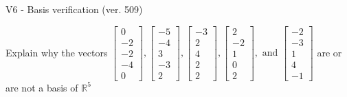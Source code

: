 \begin{exercise}
  \begin{exerciseTitle}V6 - Basis verification (ver. 509)\end{exerciseTitle}
  \begin{exerciseStatement}
    Explain why the vectors \(\left[\begin{array}{r}
0 \\
-2 \\
-2 \\
-4 \\
0
\end{array}\right] , \left[\begin{array}{r}
-5 \\
-4 \\
3 \\
-3 \\
2
\end{array}\right] , \left[\begin{array}{r}
-3 \\
2 \\
4 \\
2 \\
2
\end{array}\right] , \left[\begin{array}{r}
2 \\
-2 \\
1 \\
0 \\
2
\end{array}\right] , \text{ and } \left[\begin{array}{r}
-2 \\
-3 \\
1 \\
4 \\
-1
\end{array}\right]\) are or are not a basis of \(\mathbb{R}^5\)	



\end{exerciseStatement}
\end{exercise}

